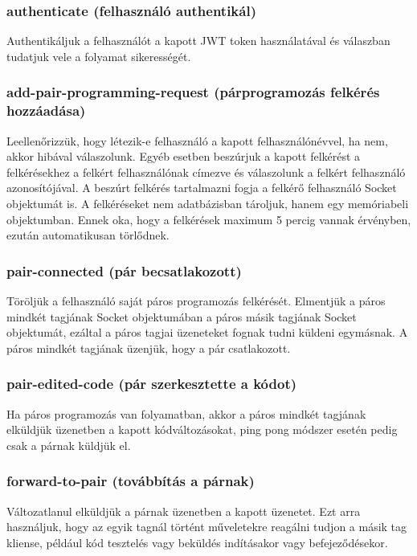 \documentclass{elteikthesis}
\begin{document}
				\subsubsection{authenticate (felhasználó authentikál)}
					Authentikáljuk a felhasználót a kapott JWT token használatával és válaszban tudatjuk vele a folyamat sikerességét.

				\subsubsection{add-pair-programming-request (párprogramozás felkérés hozzáadása)}
					Leellenőrizzük, hogy létezik-e felhasználó a kapott felhasználónévvel, ha nem, akkor hibával válaszolunk. Egyéb esetben beszúrjuk a kapott felkérést a felkérésekhez a felkért felhasználónak címezve és válaszolunk a felkért felhasználó azonosítójával. A beszúrt felkérés tartalmazni fogja a felkérő felhasználó Socket objektumát is. A felkéréseket nem adatbázisban tároljuk, hanem egy memóriabeli objektumban. Ennek oka, hogy a felkérések maximum 5 percig vannak érvényben, ezután automatikusan törlődnek.

				\subsubsection{pair-connected (pár becsatlakozott)}
					Töröljük a felhasználó saját páros programozás felkérését. Elmentjük a páros mindkét tagjának Socket objektumában a páros másik tagjának Socket objektumát, ezáltal a páros tagjai üzeneteket fognak tudni küldeni egymásnak. A páros mindkét tagjának üzenjük, hogy a pár csatlakozott.

				\subsubsection{pair-edited-code (pár szerkesztette a kódot)}
					Ha páros programozás van folyamatban, akkor a páros mindkét tagjának elküldjük üzenetben a kapott kódváltozásokat, ping pong módszer esetén pedig csak a párnak küldjük el.

				\subsubsection{forward-to-pair (továbbítás a párnak)}
					Változatlanul elküldjük a párnak üzenetben a kapott üzenetet. Ezt arra használjuk, hogy az egyik tagnál történt műveletekre reagálni tudjon a másik tag kliense, például kód tesztelés vagy beküldés indításakor vagy befejeződésekor.
\end{document}
